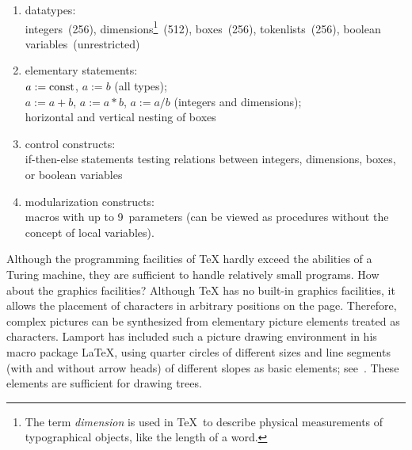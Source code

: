 \begin{enumerate}                                                               
\item[1.] datatypes:\\                                                          
     integers~(256), dimensions\footnote{The term \emph{dimension} is used      
     in \TeX\ to describe physical measurements of typographical objects,       
     like the length of a word.}~(512), boxes~(256), tokenlists~(256), boolean  
     variables~(unrestricted)                                                   
\item[2.] elementary statements:\\                                              
     $a:=\rm const$, $a:=b$ (all types);\\                                      
     $a:=a+b$, $a:=a*b$, $a:=a/b$ (integers and dimensions);\\                  
     horizontal and vertical nesting of boxes                                   
\item[3.] control constructs:\\                                                 
     if-then-else statements testing relations between integers,                
     dimensions, boxes, or boolean variables                                    
\item[4.] modularization constructs:\\                                          
     macros with up to 9~parameters (can be viewed as procedures without        
     the concept of local variables).                                               
\end{enumerate}                                                                 
                                                                                
Although the programming                                                      
facilities of \TeX{} hardly exceed the abilities of a Turing machine,
they are sufficient to
handle relatively small programs. How about the graphics facilities?   
Although \TeX{} has no built-in graphics facilities, it                         
allows the placement of characters in arbitrary positions on                    
the page. Therefore, complex pictures can be synthesized from elementary        
picture elements treated as characters. Lamport has included such               
a picture drawing environment in his macro package \LaTeX, using                
quarter circles of different sizes and line segments (with and without          
arrow heads) of different slopes as basic elements; see~\cite{LaTeX}.           
These elements are sufficient for drawing trees.                                
                                                                                
